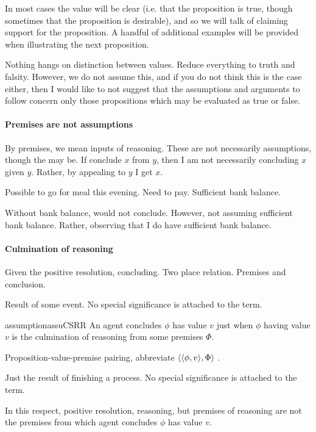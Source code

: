 \begin{note}
In most cases the value will be clear (i.e. that the proposition is true, though sometimes that the proposition is desirable), and so we will talk of claiming support for the proposition.
  A handful of additional examples will be provided when illustrating the next proposition.
\end{note}

\begin{note}
  Nothing hangs on distinction between values.
  Reduce everything to truth and falsity.
  However, we do not assume this, and if you do not think this is the case either, then I would like to not suggest that the assumptions and arguments to follow concern only those propositions which may be evaluated as true or false.
\end{note}

\paragraph{Premises are not assumptions}

\begin{note}
  By premises, we mean inputs of reasoning.
  These are not necessarily assumptions, though the may be.
  If conclude \(x\) from \(y\), then I am not necessarily concluding \(x\) given \(y\).
  Rather, by appealing to \(y\) I get \(x\).

  Possible to go for meal this evening.
  Need to pay.
  Sufficient bank balance.

  Without bank balance, would not conclude.
  However, not assuming sufficient bank balance.
  Rather, observing that I do have sufficient bank balance.
\end{note}

\paragraph{Culmination of reasoning}

\begin{note}
  Given the positive resolution, concluding.
  Two place relation.
  Premises and conclusion.

  Result of some event.
  No special significance is attached to the term.

  \begin{restatable}{assumption}{assuCSRR}
    \label{assu:CS-culmination-of-R}
    An agent concludes \(\phi\) has value \(v\) just when \(\phi\) having value \(v\) is the culmination of reasoning from some premises \(\Phi\).
  \end{restatable}

  \begin{notation}
    Proposition-value-premise pairing, abbreviate \(\langle \langle \phi, v \rangle, \Phi \rangle\) .
  \end{notation}

  Just the result of finishing a process.
  No special significance is attached to the term.

  In this respect, positive resolution, reasoning, but premises of reasoning are not the premises from which agent concludes \(\phi\) has value \(v\).
\end{note}


